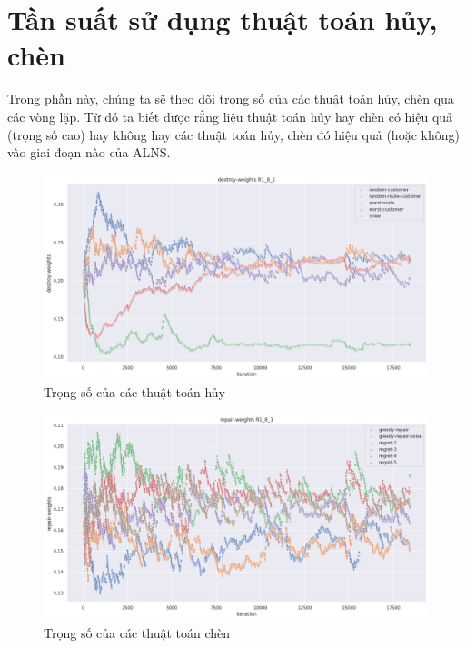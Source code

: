 \section{Tần suất sử dụng thuật toán hủy, chèn}

Trong phần này, chúng ta sẽ theo dõi trọng số của các thuật toán hủy, chèn qua các vòng lặp. Từ đó ta biết được rằng liệu thuật toán hủy hay chèn có hiệu quả (trọng số cao) hay không hay các thuật toán hủy, chèn đó hiệu quả (hoặc không) vào giai đoạn nào của ALNS.
 
\begin{figure}[H] %
	\centering %
	\includegraphics[width=1\textwidth]{figures/destroy_weights_R1_8_1.png}
	\caption{Trọng số của các thuật toán hủy}
	\label{fig:alg_01}
\end{figure}


\begin{figure}[H] %
	\centering %
	\includegraphics[width=1\textwidth]{figures/repair_weights_R1_8_1.png}
	\caption{Trọng số của các thuật toán chèn}
	\label{fig:alg_02}
\end{figure}

